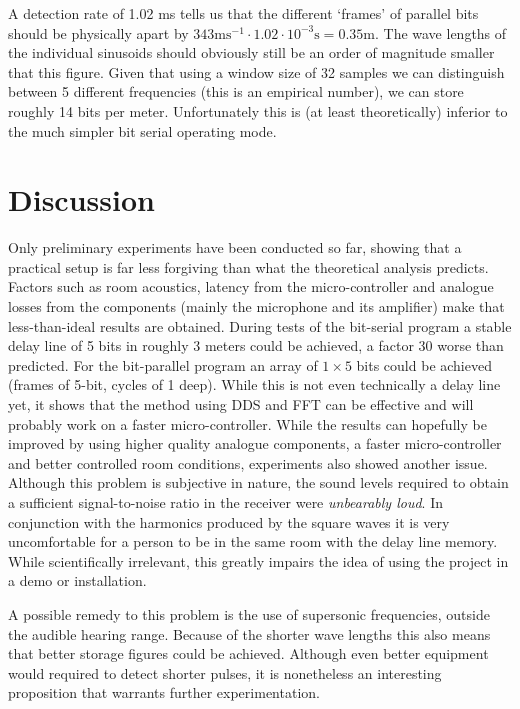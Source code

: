\documentclass[10pt,a4paper,twocolumn]{article}
\begin{document}
A detection rate of 1.02 ms tells us that the different `frames' of parallel bits should be physically apart by $343\mathrm{ms}^{-1}\cdot1.02\cdot10^{-3}\mathrm{s}=0.35\mathrm{m}$. The wave lengths of the individual sinusoids should obviously still be an order of magnitude smaller that this figure. Given that using a window size of 32 samples we can distinguish between 5 different frequencies (this is an empirical number), we can store roughly 14 bits per meter. Unfortunately this is (at least theoretically) inferior to the much simpler bit serial operating mode.

\section{Discussion}
Only preliminary experiments have been conducted so far, showing that a practical setup is far less forgiving than what the theoretical analysis predicts. Factors such as room acoustics, latency from the micro-controller and analogue losses from the components (mainly the microphone and its amplifier) make that less-than-ideal results are obtained.
During tests of the bit-serial program a stable delay line of 5 bits in roughly 3 meters could be achieved, a factor 30 worse than predicted. For the bit-parallel program an array of $1 \times 5$ bits could be achieved (frames of 5-bit, cycles of 1 deep). While this is not even technically a delay line yet, it shows that the method using DDS and FFT can be effective and will probably work on a faster micro-controller.
While the results can hopefully be improved by using higher quality analogue components, a faster micro-controller and better controlled room conditions, experiments also showed another issue. Although this problem is subjective in nature, the sound levels required to obtain a sufficient signal-to-noise ratio in the receiver were \emph{unbearably loud}. In conjunction with the harmonics produced by the square waves it is very uncomfortable for a person to be in the same room with the delay line memory. While scientifically irrelevant, this greatly impairs the idea of using the project in a demo or installation.

A possible remedy to this problem is the use of supersonic frequencies, outside the audible hearing range. Because of the shorter wave lengths this also means that better storage figures could be achieved. Although even better equipment would required to detect shorter pulses, it is nonetheless an interesting proposition that warrants further experimentation.  
\end{document}
